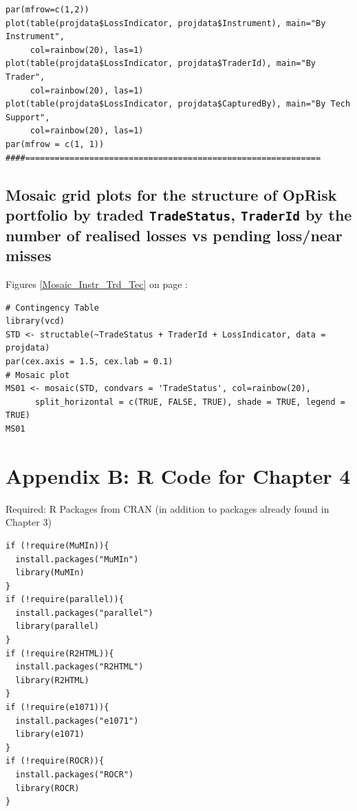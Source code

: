 \documentclass{DissertateUSU}
\begin{document}
\small

\begin{verbatim}
par(mfrow=c(1,2))
plot(table(projdata$LossIndicator, projdata$Instrument), main="By Instrument",
     col=rainbow(20), las=1)
plot(table(projdata$LossIndicator, projdata$TraderId), main="By Trader", 
     col=rainbow(20), las=1)
plot(table(projdata$LossIndicator, projdata$CapturedBy), main="By Tech Support",
     col=rainbow(20), las=1)
par(mfrow = c(1, 1))
####============================================================
\end{verbatim}

\normalsize

\subsection{Mosaic grid plots for the structure of OpRisk portfolio by traded \texttt{TradeStatus}, \texttt{TraderId} by the number of realised losses vs pending loss/near misses}
\label{ssec:Mosaic cross-sectional plot}

Figures \ref{Mosaic_Instr_Trd_Tec} on page
\pageref{Mosaic_Instr_Trd_Tec}:

\small

\begin{verbatim}
# Contingency Table
library(vcd)
STD <- structable(~TradeStatus + TraderId + LossIndicator, data = projdata)
par(cex.axis = 1.5, cex.lab = 0.1)
# Mosaic plot
MS01 <- mosaic(STD, condvars = 'TradeStatus', col=rainbow(20), 
      split_horizontal = c(TRUE, FALSE, TRUE), shade = TRUE, legend = TRUE)
MS01
\end{verbatim}

\normalsize

\clearpage

\section{Appendix B: R Code for Chapter 4}
\label{sec:Appendix B: R Code for Chapter 4}

\singlespace

Required: R Packages from CRAN (in addition to packages already found in
Chapter 3)

\small

\begin{verbatim}
if (!require(MuMIn)){
  install.packages("MuMIn")
  library(MuMIn)
}
if (!require(parallel)){
  install.packages("parallel")
  library(parallel)
}
if (!require(R2HTML)){
  install.packages("R2HTML")
  library(R2HTML)
}
if (!require(e1071)){
  install.packages("e1071")
  library(e1071)
}
if (!require(ROCR)){
  install.packages("ROCR")
  library(ROCR)
}
\end{verbatim}
\end{document}
